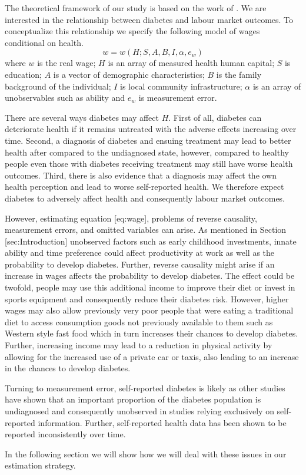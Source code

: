 The theoretical framework of our study is based on the work of \citet{Strauss1998}. We are interested in the relationship between diabetes and labour market outcomes. To conceptualize this relationship we specify the following model of wages conditional on health.
\begin{equation}
w=w(H;S,A,B,I,\alpha,e_{w})\label{eq:wage}
\end{equation}
where $w$ is the real wage; $H$ is an array of measured health human capital; $S$ is education; $A$ is a vector of demographic characteristics; $B$ is the family background of the individual; $I$ is local community infrastructure; $\alpha$ is an array of unobservables such as ability and $e_w$ is measurement error. 

There are several ways diabetes may affect $H$. First of all, diabetes can deteriorate health if it remains untreated with the adverse effects increasing over time. Second, a diagnosis of diabetes and ensuing treatment may lead to better health after compared to the undiagnosed state, however, compared to healthy people even those with diabetes receiving treatment may still have worse health outcomes. Third, there is also evidence that a diagnosis may affect the own health perception and lead to worse self-reported health. We therefore expect diabetes to adversely affect health and consequently labour market outcomes.

However, estimating equation [eq:wage], problems of reverse causality, measurement errors, and omitted variables can arise. As mentioned in Section [sec:Introduction] unobserved factors such as early childhood investments, innate ability and time preference could affect productivity at work as well as the probability to develop diabetes. Further, reverse causality might arise if an increase in wages affects the probability to develop diabetes. The effect could be twofold, people may use this additional income to improve their diet or invest in sports equipment and consequently reduce their diabetes risk. However, higher wages may also allow previously very poor people that were eating a traditional diet to access consumption goods not previously available to them such as Western style fast food which in turn increases their chances to develop diabetes. Further, increasing income may lead to a reduction in physical activity by allowing for the increased use of a private car or taxis, also leading to an increase in the chances to develop diabetes. 

Turning to measurement error, self-reported diabetes is likely as other studies have shown that an important proportion of the diabetes population is undiagnosed and consequently unobserved in studies relying exclusively on self-reported information. Further, self-reported health data has been shown to be reported inconsistently over time.

In the following section we will show how we will deal with these issues in our estimation strategy.